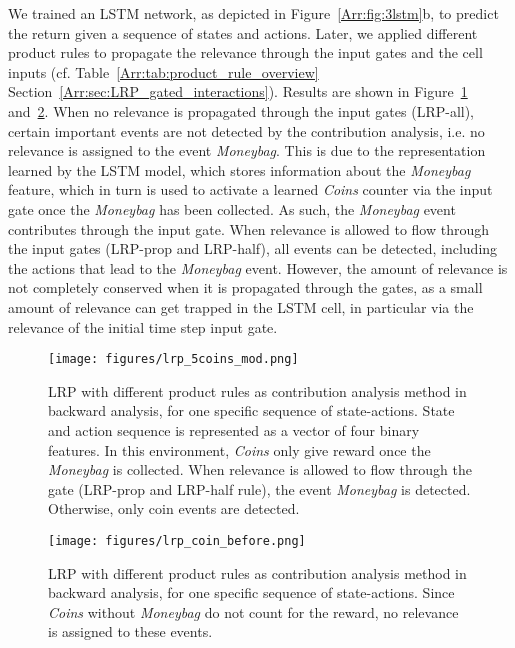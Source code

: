 \documentclass[runningheads]{llncs}
\begin{document}
We trained an LSTM network, as depicted in Figure~\ref{Arr:fig:3lstm}b, to predict the return given a sequence of states and actions. Later, we applied different product rules to propagate the relevance through the input gates and the cell inputs (cf. Table~\ref{Arr:tab:product_rule_overview} Section~\ref{Arr:sec:LRP_gated_interactions}). Results are shown in Figure~\ref{Arr:fig:lrp_5coints} and~\ref{Arr:fig:lrp_coinbefore}.
When no relevance is propagated through the input gates (LRP-all),
certain important events are not detected by the contribution analysis,
i.e. no relevance is assigned to the event {\em Moneybag}.
This is due to the representation learned by the LSTM model,
which stores information about the {\em Moneybag} feature,
which in turn is used to activate a learned {\em Coins} counter via the input gate once the {\em Moneybag} has been collected.
As such, the {\em Moneybag} event contributes through the input gate.
When relevance is allowed to flow through the input gates (LRP-prop and LRP-half),
all events can be detected,
including the actions that lead to the {\em Moneybag} event.
However, the amount of relevance is not completely conserved when it is propagated through the gates,
as a small amount of relevance can get trapped in the LSTM cell, in particular via the relevance of the initial time step input gate.

\begin{figure}[!h]
\centering
\texttt{[image: figures/lrp\_5coins\_mod.png]}
\caption{LRP with different product rules as contribution analysis method in backward analysis, for one specific sequence of state-actions.
State and action sequence is represented as a vector of four binary features.
In this environment, {\em Coins} only give reward once the {\em Moneybag} is collected. When relevance is allowed to flow through the gate (LRP-prop and LRP-half rule), the event {\em Moneybag} is detected. Otherwise, only coin events are detected.
\label{Arr:fig:lrp_5coints}}
\end{figure}


\begin{figure}[!h]
\centering
\texttt{[image: figures/lrp\_coin\_before.png]}
\caption{LRP with different product rules as contribution analysis method in backward analysis, for one specific sequence of state-actions.
Since {\em Coins} without {\em Moneybag} do not count for the reward, no relevance is assigned to these events. 
\label{Arr:fig:lrp_coinbefore}}
\end{figure}
\end{document}
